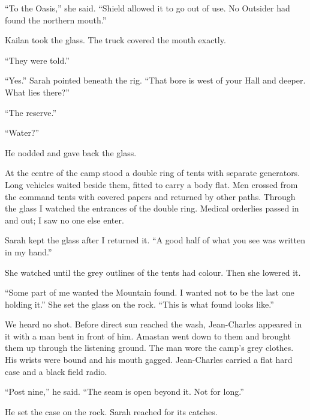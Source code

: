 ``To the Oasis,'' she said. ``Shield allowed it to go out of use. No Outsider had found the northern mouth.''\par

Kailan took the glass. The truck covered the mouth exactly.\par

``They were told.''\par

``Yes.'' Sarah pointed beneath the rig. ``That bore is west of your Hall and deeper. What lies there?''\par

``The reserve.''\par

``Water?''\par

He nodded and gave back the glass.\par

At the centre of the camp stood a double ring of tents with separate generators. Long vehicles waited beside them, fitted to carry a body flat. Men crossed from the command tents with covered papers and returned by other paths. Through the glass I watched the entrances of the double ring. Medical orderlies passed in and out; I saw no one else enter.\par

Sarah kept the glass after I returned it. ``A good half of what you see was written in my hand.''\par

She watched until the grey outlines of the tents had colour. Then she lowered it.\par

``Some part of me wanted the Mountain found. I wanted not to be the last one holding it.'' She set the glass on the rock. ``This is what found looks like.''\par

We heard no shot. Before direct sun reached the wash, Jean-Charles appeared in it with a man bent in front of him. Amastan went down to them and brought them up through the listening ground. The man wore the camp's grey clothes. His wrists were bound and his mouth gagged. Jean-Charles carried a flat hard case and a black field radio.\par

``Post nine,'' he said. ``The seam is open beyond it. Not for long.''\par

He set the case on the rock. Sarah reached for its catches.\par

